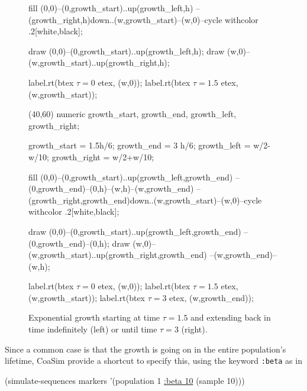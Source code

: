 \documentclass{manual}
\begin{document}
\begin{empfile}
\begin{figure}[t]
\begin{empdef}
    fill (0,0)--(0,growth_start)..{up}(growth_left,h)
         --(growth_right,h){down}..(w,growth_start)--(w,0)--cycle
         withcolor .2[white,black];
  
    draw (0,0)--(0,growth_start)..{up}(growth_left,h);
    draw (w,0)--(w,growth_start)..{up}(growth_right,h);
  
    label.rt(btex $\tau=0$ etex,   (w,0));
    label.rt(btex $\tau=1.5$ etex, (w,growth_start));
  \end{empdef}
  \begin{empdef}(40,60)
    numeric growth_start, growth_end, growth_left, growth_right;

    growth_start = 1.5h/6;
    growth_end   = 3  h/6;
    growth_left  = w/2-w/10;
    growth_right = w/2+w/10;

    fill (0,0)--(0,growth_start)..{up}(growth_left,growth_end)
         --(0,growth_end)--(0,h)--(w,h)--(w,growth_end)
         --(growth_right,growth_end){down}..(w,growth_start)--(w,0)--cycle
         withcolor .2[white,black];
  
    draw (0,0)--(0,growth_start)..{up}(growth_left,growth_end)
         --(0,growth_end)--(0,h);
    draw (w,0)--(w,growth_start)..{up}(growth_right,growth_end)
         --(w,growth_end)--(w,h);
  
    label.rt(btex $\tau=0$ etex,   (w,0));
    label.rt(btex $\tau=1.5$ etex, (w,growth_start));
    label.rt(btex $\tau=3$ etex,   (w,growth_end));
  \end{empdef}
  
  \hspace*{.5cm}
  \hfill
  \hspace*{.5cm}

  \caption{Exponential growth starting at time $\tau=1.5$ and
    extending back in time indefinitely (left) or until time $\tau=3$
    (right).}
  \label{fig:growth}
\end{figure}

Since a common case is that the growth is going on in the entire
population's lifetime, CoaSim provide a shortcut to specify this, using
the keyword \texttt{:beta} as in
\begin{code}
(simulate-sequences markers '(population 1 \underline{:beta 10} (sample 10)))
\end{code}


\end{empfile}
\end{document}

